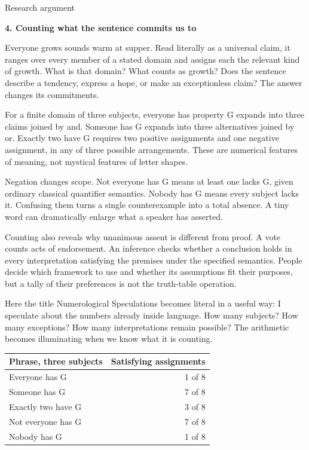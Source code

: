 \documentclass[10pt]{article}
\begin{document}
\clearpage
{\small\color{accent}Research argument}\par
{\LARGE\bfseries\color{ink}4. Counting what the sentence commits us to}\par\vspace{7pt}
Everyone grows sounds warm at supper. Read literally as a universal claim, it ranges over every member of a stated domain and assigns each the relevant kind of growth. What is that domain? What counts as growth? Does the sentence describe a tendency, express a hope, or make an exceptionless claim? The answer changes its commitments.\par
For a finite domain of three subjects, everyone has property G expands into three claims joined by and. Someone has G expands into three alternatives joined by or. Exactly two have G requires two positive assignments and one negative assignment, in any of three possible arrangements. These are numerical features of meaning, not mystical features of letter shapes.\par
Negation changes scope. Not everyone has G means at least one lacks G, given ordinary classical quantifier semantics. Nobody has G means every subject lacks it. Confusing them turns a single counterexample into a total absence. A tiny word can dramatically enlarge what a speaker has asserted.\par
Counting also reveals why unanimous assent is different from proof. A vote counts acts of endorsement. An inference checks whether a conclusion holds in every interpretation satisfying the premises under the specified semantics. People decide which framework to use and whether its assumptions fit their purposes, but a tally of their preferences is not the truth-table operation.\par
Here the title Numerological Speculations becomes literal in a useful way: I speculate about the numbers already inside language. How many subjects? How many exceptions? How many interpretations remain possible? The arithmetic becomes illuminating when we know what it is counting.\par
{\small\begin{tabularx}{\linewidth}{Xr}\toprule
Phrase, three subjects & Satisfying assignments\\\midrule
Everyone has G & 1 of 8\\
Someone has G & 7 of 8\\
Exactly two have G & 3 of 8\\
Not everyone has G & 7 of 8\\
Nobody has G & 1 of 8\\
\bottomrule\end{tabularx}}\par
\end{document}
